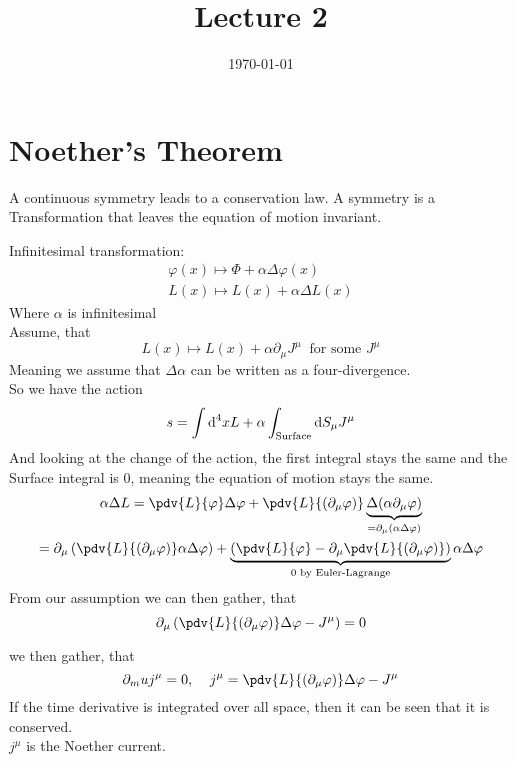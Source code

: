 \documentclass[]{scrartcl}
\title{Lecture 2}
\author{}
\date{\today}
\begin{document}
\maketitle
\newpage
\tableofcontents
\newpage

 \section{Noether's Theorem}

A continuous symmetry leads to a conservation law. A symmetry is a Transformation that leaves the equation of motion invariant.

Infinitesimal transformation:
\begin{gather}
	\varphi(x) \mapsto \Phi + \alpha\Delta\varphi(x)\\
	L(x) \mapsto L(x) + \alpha\Delta L(x)
\end{gather}
Where $\alpha$ is infinitesimal\\
Assume, that
\begin{equation}
	L(x)\mapsto L(x) + \alpha\partial_\mu J^\mu\;\;\text{for some }J^\mu
\end{equation}
Meaning we assume that $\Delta\alpha$ can be written as a four-divergence.\\
So we have the action
\begin{equation}
	s = \int\text d ^4x L + \alpha \int_\text{Surface}\text{d} S_\mu J^\mu
\end{equation}
And looking at the change of the action, the first integral stays the same and the Surface integral is 0, meaning the equation of motion stays the same.
\begin{gather}
	\alpha\Delta L = \pdv{L}{\varphi}\Delta\varphi + \pdv{L}{(\partial_\mu\varphi)}\underbrace{\Delta(\alpha\partial_\mu\varphi)}_{= \partial_\mu(\alpha\Delta\varphi)}\\
	= \partial_\mu\left(\pdv{L}{(\partial_\mu\varphi)}\alpha\Delta\varphi\right) + \underbrace{\left(\pdv{L}{\varphi}-\partial_\mu\pdv{L}{(\partial_\mu\varphi)}\right)}_{0\text{ by Euler-Lagrange}}\alpha\Delta\varphi
\end{gather}
From our assumption we can then gather, that
\begin{equation}
	\partial_\mu\left(\pdv{L}{(\partial_\mu\varphi)}\Delta\varphi - J^\mu\right) = 0
\end{equation}

we then gather, that
\begin{equation}
	\partial_mu j^\mu = 0,\;\;\;\; j^\mu = \pdv{L}{(\partial_\mu\varphi)}\Delta\varphi - J^\mu
\end{equation}
If the time derivative is integrated over all space, then it can be seen that it is conserved.\\
$j^\mu$ is the Noether current.
\end{document}
